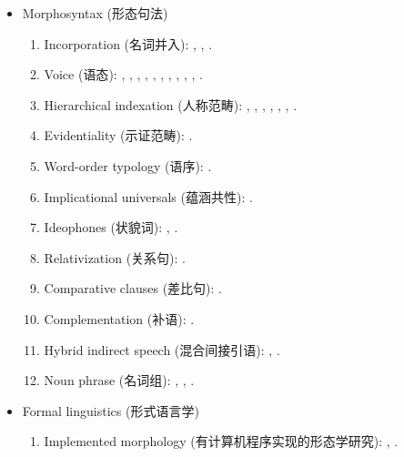 \documentclass[oneside,a4paper,11pt]{article}
\newcommand{\zh}[1]{{\cn #1}}
\newcommand{\lingua}[3]{#1 (\zh{#3})}
\begin{document}
\begin{itemize}
\begin{itemize}
\item \lingua{Morphosyntax}{Morphosyntaxe}{形态句法}
\begin{enumerate}
\item  \lingua{Incorporation}{Incorporation}{名词并入}: \cite{jacques11tangut.verb}, \cite{jacques12demotion}, \cite{jacques12incorp}.
\item  \lingua{Voice}{Voix}{语态}:  \cite{jacques07passif}, \cite{jacques10refl}, \cite{jacques12demotion}, \cite{jacques13derivational.khaling}, \cite{jacques13tropative}, \cite{jacques14antipassive}, \cite{jacques15derivational.khaling}, \cite{jacques15causative},  \cite{jacques15spontaneous},  \cite{jacques16si}, \cite{jacques17generic}.
\item \lingua{Hierarchical indexation}{Indexation hiérarchique}{人称范畴}:  \cite{jacques10inverse},     \cite{jacques12khaling},   \cite{antonov14rtau}, \cite{jacques14inverse}, \cite{jacques14rtau}, \cite{jacques16th}, \cite{jacques17stau}.
\item \lingua{Evidentiality}{Evidentialité}{示证范畴}: \cite{jacques14auditory}.
\item \lingua{Word-order typology}{Typologie de l'ordre des mots}{语序}: \cite{jacques13harmonization}.
\item \lingua{Implicational universals}{Universels implicationnels}{蕴涵共性}: \cite{antonov14need}.
\item \lingua{Ideophones}{Idéophones}{状貌词}: \cite{japhug14ideophones}, \cite{jacques17ipa}.
\item \lingua{Relativization}{Relatives}{关系句}: \cite{jacques16relatives}.
\item \lingua{Comparative clauses}{Comparatives}{差比句}: \cite{jacques16comparative}.
\item \lingua{Complementation}{Complétives}{补语}: \cite{jacques16complementation}.
\item \lingua{Hybrid indirect speech}{Discours indirect hybride}{混合间接引语}: \cite{jacques16complementation}, \cite{jacques17stau}.
\item \lingua{Noun phrase}{Syntagmes nominaux}{名词组}: \cite{jacques17num}, \cite{jacques17sketch}, \cite{jacques17comitative}.
\end{enumerate}

\item \lingua{Formal linguistics}{Linguistique formelle}{形式语言学}
\begin{enumerate}
\item \lingua{Implemented morphology}{Morphologie implémentée}{有计算机程序实现的形态学研究}: \cite{walther14inv.canon}, \cite{walther14compactness}.
\end{enumerate}


\end{itemize}
\end{itemize}
\end{document}
